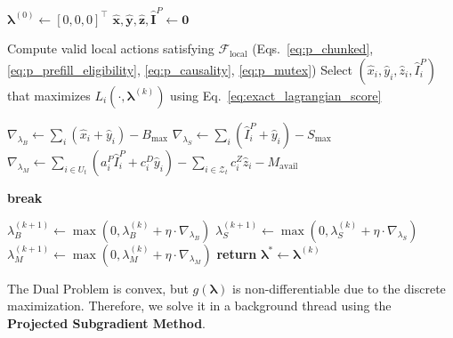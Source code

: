 \documentclass[11pt]{article}
\begin{document}
\begin{algorithm}[!ht]
\caption{Slow Path: Strategic Subgradient Descent Planner}
\label{alg:slow_path}
\begin{algorithmic}[1]
    \State $\boldsymbol{\lambda}^{(0)} \gets [0, 0, 0]^\top$
        \State $\hat{\mathbf{x}}, \hat{\mathbf{y}}, \hat{\mathbf{z}}, \hat{\mathbf{I}}^P \gets \mathbf{0}$
        
        \State {}
            \State Compute valid local actions satisfying $\mathcal{F}_{\text{local}}$ (Eqs.~\ref{eq:p_chunked}, \ref{eq:p_prefill_eligibility}, \ref{eq:p_causality}, \ref{eq:p_mutex})
            \State Select $(\hat{x}_i, \hat{y}_i, \hat{z}_i, \hat{I}_i^P)$ that maximizes $L_i(\cdot, \boldsymbol{\lambda}^{(k)})$ using Eq.~\ref{eq:exact_lagrangian_score}
        \EndFor
        
        \State {}
        \State $\nabla_{\lambda_B} \gets \sum_{i} (\hat{x}_i + \hat{y}_i) - B_{\max}$
        \State $\nabla_{\lambda_S} \gets \sum_{i} (\hat{I}_i^P + \hat{y}_i) - S_{\max}$
        \State \(\nabla_{\lambda_M} \gets \sum_{i \in U_t} (a_i^P \hat{I}_i^P + c_i^D \hat{y}_i) - \sum_{i \in \mathcal{Z}_t} c_i^Z \hat{z}_i - M_{\mathrm{avail}}\)
        
        \State {}
            \State \textbf{break} 
        \EndIf
        
        \State {}
        \State $\lambda_B^{(k+1)} \gets \max(0, \lambda_B^{(k)} + \eta \cdot \nabla_{\lambda_B})$
        \State $\lambda_S^{(k+1)} \gets \max(0, \lambda_S^{(k)} + \eta \cdot \nabla_{\lambda_S})$
        \State $\lambda_M^{(k+1)} \gets \max(0, \lambda_M^{(k)} + \eta \cdot \nabla_{\lambda_M})$
    \EndFor
    \State \textbf{return} $\boldsymbol{\lambda}^* \gets \boldsymbol{\lambda}^{(k)}$ 
\EndProcedure
\end{algorithmic}
\end{algorithm}


The Dual Problem is convex, but $g(\boldsymbol{\lambda})$ is non-differentiable due to the discrete maximization. Therefore, we solve it in a background thread using the \textbf{Projected Subgradient Method}. 
\end{document}
